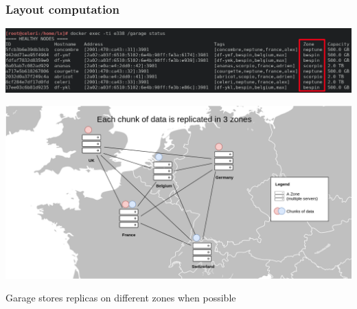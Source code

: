 \documentclass[aspectratio=169,xcolor={svgnames}]{beamer}
\begin{document}
\begin{frame}
	\frametitle{Layout computation}
	\begin{overprint}
		\begin{center}
			\includegraphics[width=\linewidth, trim=0 0 0 -4cm]{../assets/screenshots/garage_status_0.9_prod_zonehl.png}
		\end{center}
		\begin{center}
			\includegraphics[width=.7\linewidth]{../assets/map.png}
		\end{center}
	\end{overprint}
	\vspace{1em}
	Garage stores replicas on different zones when possible
\end{frame}
\end{document}
